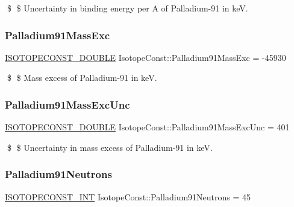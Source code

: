 \$ \$ Uncertainty in binding energy per A of Palladium-\/91 in keV. \mbox{\label{group___isotope_const-_palladium-_pd91_ga39d689baeb0ba68d86ad8e2a4f06608a}} 
\subsubsection{\texorpdfstring{Palladium91\+Mass\+Exc}{Palladium91MassExc}}
{\footnotesize\ttfamily \mbox{\hyperlink{group___isotope_const-_macros_ga8f45a7272ce02c0b4c65c44636ed719a}{I\+S\+O\+T\+O\+P\+E\+C\+O\+N\+S\+T\+\_\+\+D\+O\+U\+B\+LE}} Isotope\+Const\+::\+Palladium91\+Mass\+Exc = -\/45930}

\$ \$ Mass excess of Palladium-\/91 in keV. \mbox{\label{group___isotope_const-_palladium-_pd91_ga76407b91114e83d58537211d9212f735}} 
\subsubsection{\texorpdfstring{Palladium91\+Mass\+Exc\+Unc}{Palladium91MassExcUnc}}
{\footnotesize\ttfamily \mbox{\hyperlink{group___isotope_const-_macros_ga8f45a7272ce02c0b4c65c44636ed719a}{I\+S\+O\+T\+O\+P\+E\+C\+O\+N\+S\+T\+\_\+\+D\+O\+U\+B\+LE}} Isotope\+Const\+::\+Palladium91\+Mass\+Exc\+Unc = 401}

\$ \$ Uncertainty in mass excess of Palladium-\/91 in keV. \mbox{\label{group___isotope_const-_palladium-_pd91_ga3c120f85d5d7c2410542a701a17e8744}} 
\subsubsection{\texorpdfstring{Palladium91\+Neutrons}{Palladium91Neutrons}}
{\footnotesize\ttfamily \mbox{\hyperlink{group___isotope_const-_macros_ga5f18360b3e99483a35c32d789e62621c}{I\+S\+O\+T\+O\+P\+E\+C\+O\+N\+S\+T\+\_\+\+I\+NT}} Isotope\+Const\+::\+Palladium91\+Neutrons = 45}

